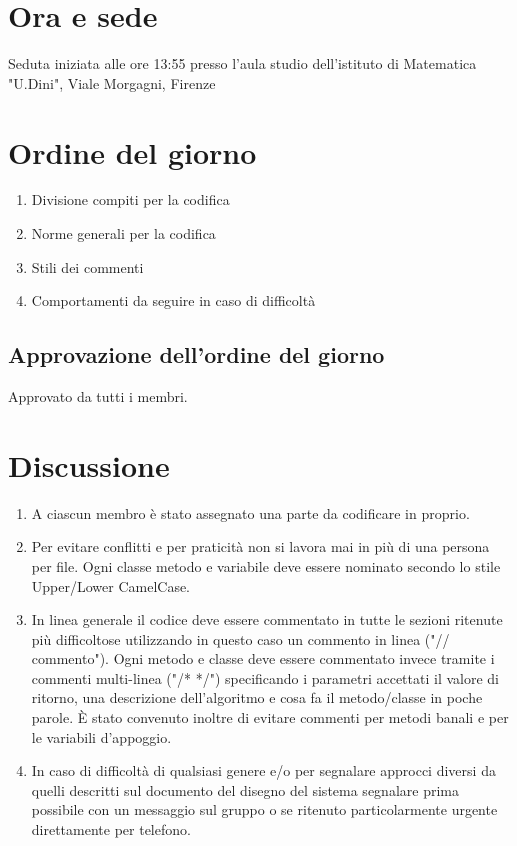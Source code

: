\section*{Ora e sede}
Seduta iniziata alle ore 13:55 presso l'aula studio dell'istituto di Matematica
"U.Dini", Viale Morgagni, Firenze

\section*{Ordine del giorno}
\begin{enumerate}
\item Divisione compiti per la codifica
\item Norme generali per la codifica
\item Stili dei commenti
\item Comportamenti da seguire in caso di difficolt\`a
\end{enumerate}

\subsection*{Approvazione dell'ordine del giorno}
Approvato da tutti i membri.

\section*{Discussione}
\begin{enumerate}
\item A ciascun membro \`e stato assegnato una parte da codificare in proprio.
\item Per evitare conflitti e per praticit\`a non si lavora mai in pi\`u di una
persona per file. Ogni classe metodo e variabile deve essere nominato secondo 
lo stile Upper/Lower CamelCase.
\item In linea generale il codice deve essere commentato in tutte le sezioni 
ritenute pi\`u difficoltose utilizzando in questo caso un commento in linea ("//
commento"). Ogni metodo e classe deve essere commentato invece tramite i 
commenti multi-linea ("/*  */") specificando i parametri accettati il valore di
ritorno, una descrizione dell'algoritmo e cosa fa il metodo/classe in poche 
parole. \`E stato convenuto inoltre di evitare commenti per metodi banali e per
le variabili d'appoggio.
\item In caso di difficolt\`a di qualsiasi genere e/o per segnalare approcci
diversi da quelli descritti sul documento del disegno del sistema segnalare 
prima possibile con un messaggio sul gruppo o se ritenuto particolarmente 
urgente direttamente per telefono.
\end{enumerate}

